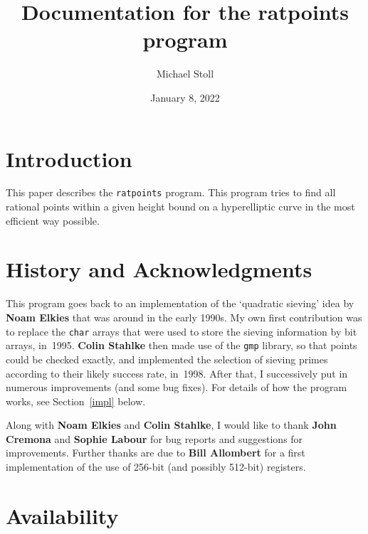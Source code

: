 \documentclass[12pt,a4paper,oneside]{amsart}
\begin{document}
\title{Documentation for the ratpoints program}

\author{Michael Stoll}
\address{Mathematisches Institut,
         Universit\"at Bayreuth,
         95440 Bayreuth, Germany.}
\date{January 8, 2022}

\maketitle


\section{Introduction}

This paper describes the \texttt{ratpoints} program. This program tries to
find all rational points within a given height bound on a hyperelliptic
curve in the most efficient way possible.


\section{History and Acknowledgments}

This program goes back to an implementation of the `quadratic sieving'
idea by \textbf{Noam Elkies} that was around in the early 1990s. My own
first contribution was to replace the \texttt{char} arrays that were used
to store the sieving information by bit arrays, in~1995. \textbf{Colin Stahlke}
then made use of the \texttt{gmp} library, so that points could be checked
exactly, and implemented the selection of sieving primes according to
their likely success rate, in~1998. After that, I successively put in
numerous improvements (and some bug fixes). For details of how the
program works, see Section~\ref{impl} below.

Along with \textbf{Noam Elkies} and \textbf{Colin Stahlke}, I would like to
thank \textbf{John Cremona} and \textbf{Sophie Labour} for bug reports and
suggestions for improvements. Further thanks are due to \textbf{Bill Allombert}
for a first implementation of the use of 256-bit (and possibly 512-bit) registers.


\section{Availability}
\end{document}
